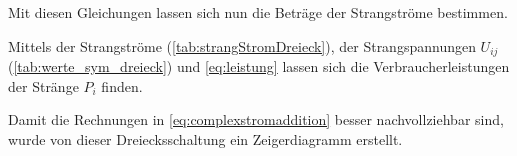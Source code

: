\documentclass[12pt,english,ngerman]{scrartcl}
\begin{document}
Mit diesen Gleichungen lassen sich nun die Beträge der Strangströme bestimmen.

\begin{table}[H]
	\caption[Errechnete Strangströme bei der Dreiecksschaltung]{ Errechnete Strangströme
		einer symmetrisch ohmsch-belasteten Dreiecksschaltung, siehe
		\autoref{fig:aufbau1}. Zur Berechnung wurde \autoref{eq:complexstromaddition}
		und die Daten aus \autoref{tab:werte_sym_dreieck} entnommen. \\
		$I_{ij} \dots$ errechnete Strangströme vom i-ten zum j-ten Leiter in \si{\ampere}.
	}\label{tab:strangStromDreieck}
	\centering
	
\end{table}

Mittels der Strangströme (\autoref{tab:strangStromDreieck}), der
Strangspannungen $U_{ij}$ (\autoref{tab:werte_sym_dreieck}) und
\autoref{eq:leistung} lassen sich die Verbraucherleistungen der Stränge $P_i$
finden.

\begin{table}[H]
	\caption[Errechnete Leistungen bei der Dreiecksschaltung]{ Errechnete Leistungen bei der
		Dreiecksschaltung                                      \\
		$P_i^C \dots$ errechnete Leistung am i-ten Strang in W \\
		$P_{ges}^C \dots$ errechnete Gesamtleistung in W       \\
		$P_{ges}^M \dots$ gemessene Gesamtleistung in W
	}\label{tab:powerDreieck}
	\centering
	
\end{table}

Damit die Rechnungen in \autoref{eq:complexstromaddition} besser
nachvollziehbar sind, wurde von dieser Dreiecksschaltung ein Zeigerdiagramm
erstellt.
\end{document}
